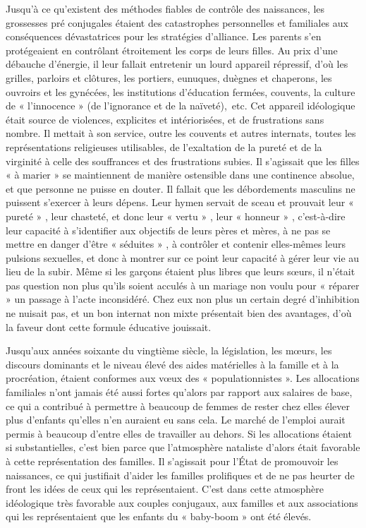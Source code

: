 
 Jusqu'à ce qu'existent des méthodes fiables de contrôle des naissances, les grossesses pré conjugales étaient des catastrophes personnelles et familiales aux conséquences dévastatrices pour les stratégies d'alliance. Les parents s'en protégeaient en contrôlant étroitement les corps de leurs filles. Au prix d'une débauche d'énergie, il leur fallait entretenir un lourd appareil répressif, d'où les grilles, parloirs et clôtures, les portiers, eunuques, duègnes et chaperons, les ouvroirs et les gynécées, les institutions d'éducation fermées, couvents, la culture de « l'innocence » (de l'ignorance et de la naïveté),~etc. Cet appareil idéologique était source de violences, explicites et intériorisées, et de frustrations sans nombre. Il mettait à son service, outre les couvents et autres internats, toutes les représentations religieuses utilisables, de l'exaltation de la pureté et de la virginité à celle des souffrances et des frustrations subies. Il s'agissait que les filles « à marier » se maintiennent de manière ostensible dans une continence absolue, et que personne ne puisse en douter. Il fallait que les débordements masculins ne puissent s'exercer à leurs dépens. Leur hymen servait de sceau et prouvait leur « pureté » , leur chasteté, et donc leur « vertu » , leur « honneur » , c'est-à-dire leur capacité à s'identifier aux objectifs de leurs pères et mères, à ne pas se mettre en danger d'être « séduites » , à contrôler et contenir elles-mêmes leurs pulsions sexuelles, et donc à montrer sur ce point leur capacité à gérer leur vie au lieu de la subir. Même si les garçons étaient plus libres que leurs sœurs, il n'était pas question non plus qu'ils soient acculés à un mariage non voulu pour « réparer » un passage à l'acte inconsidéré. Chez eux non plus un certain degré d'inhibition ne nuisait pas, et un bon internat non mixte présentait bien des avantages, d'où la faveur dont cette formule éducative jouissait.

 Jusqu'aux années soixante du vingtième siècle, la législation, les mœurs, les discours dominants et le niveau élevé des aides matérielles à la famille et à la procréation, étaient conformes aux vœux des « populationnistes ». Les allocations familiales n'ont jamais été aussi fortes qu'alors par rapport aux salaires de base, ce qui a contribué à permettre à beaucoup de femmes de rester chez elles élever plus d'enfants qu'elles n'en auraient eu sans cela. Le marché de l'emploi aurait permis à beaucoup d'entre elles de travailler au dehors. Si les allocations étaient si substantielles, c'est bien parce que l'atmosphère nataliste d'alors était favorable à cette représentation des familles. Il s'agissait pour l'État de promouvoir les naissances, ce qui justifiait d'aider les familles prolifiques et de ne pas heurter de front les idées de ceux qui les représentaient. C'est dans cette atmosphère idéologique très favorable aux couples conjugaux, aux familles et aux associations qui les représentaient que les enfants du « baby-boom » ont été élevés. 

